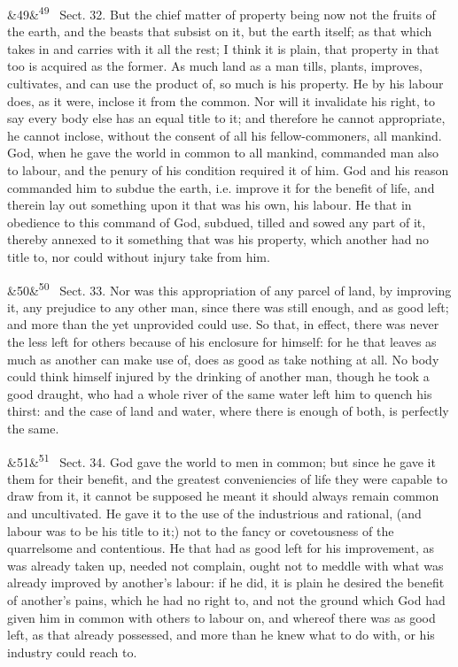 \documentclass[12pt]{article}
\newcommand{\para}[1][]{\par\noindent\ifx&#1&\else\textsuperscript{\footnotesize #1}~\fi}
\begin{document}
\para[49] Sect. 32. But the chief matter of property being now not the fruits of the earth, and the beasts that subsist on it, but the earth itself; as that which takes in and carries with it all the rest; I think it is plain, that property in that too is acquired as the former. As much land as a man tills, plants, improves, cultivates, and can use the product of, so much is his property. He by his labour does, as it were, inclose it from the common. Nor will it invalidate his right, to say every body else has an equal title to it; and therefore he cannot appropriate, he cannot inclose, without the consent of all his fellow-commoners, all mankind. God, when he gave the world in common to all mankind, commanded man also to labour, and the penury of his condition required it of him. God and his reason commanded him to subdue the earth, i.e. improve it for the benefit of life, and therein lay out something upon it that was his own, his labour. He that in obedience to this command of God, subdued, tilled and sowed any part of it, thereby annexed to it something that was his property, which another had no title to, nor could without injury take from him.

\para[50] Sect. 33. Nor was this appropriation of any parcel of land, by improving it, any prejudice to any other man, since there was still enough, and as good left; and more than the yet unprovided could use. So that, in effect, there was never the less left for others because of his enclosure for himself: for he that leaves as much as another can make use of, does as good as take nothing at all. No body could think himself injured by the drinking of another man, though he took a good draught, who had a whole river of the same water left him to quench his thirst: and the case of land and water, where there is enough of both, is perfectly the same.

\para[51] Sect. 34. God gave the world to men in common; but since he gave it them for their benefit, and the greatest conveniencies of life they were capable to draw from it, it cannot be supposed he meant it should always remain common and uncultivated. He gave it to the use of the industrious and rational, (and labour was to be his title to it;) not to the fancy or covetousness of the quarrelsome and contentious. He that had as good left for his improvement, as was already taken up, needed not complain, ought not to meddle with what was already improved by another's labour: if he did, it is plain he desired the benefit of another's pains, which he had no right to, and not the ground which God had given him in common with others to labour on, and whereof there was as good left, as that already possessed, and more than he knew what to do with, or his industry could reach to.
\end{document}
